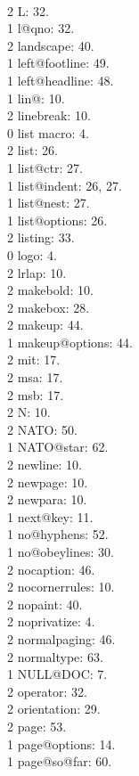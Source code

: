 \\2 L: 32.
\\1 l@qno: 32.
\\2 landscape: 40.
\\1 left@footline: 49.
\\1 left@headline: 48.
\\1 lin@: 10.
\\2 linebreak: 10.
\\0 list macro: 4.
\\2 list: 26.
\\1 list@ctr: 27.
\\1 list@indent: 26, 27.
\\1 list@nest: 27.
\\1 list@options: 26.
\\2 listing: 33.
\\0 logo: 4.
\\2 lrlap: 10.
\\2 makebold: 10.
\\2 makebox: 28.
\\2 makeup: 44.
\\1 makeup@options: 44.
\\2 mit: 17.
\\2 msa: 17.
\\2 msb: 17.
\\2 N: 10.
\\2 NATO: 50.
\\1 NATO@star: 62.
\\2 newline: 10.
\\2 newpage: 10.
\\2 newpara: 10.
\\1 next@key: 11.
\\1 no@hyphens: 52.
\\1 no@obeylines: 30.
\\2 nocaption: 46.
\\2 nocornerrules: 10.
\\2 nopaint: 40.
\\2 noprivatize: 4.
\\2 normalpaging: 46.
\\2 normaltype: 63.
\\1 NULL@DOC: 7.
\\2 operator: 32.
\\2 orientation: 29.
\\2 page: 53.
\\1 page@options: 14.
\\1 page@so@far: 60.
